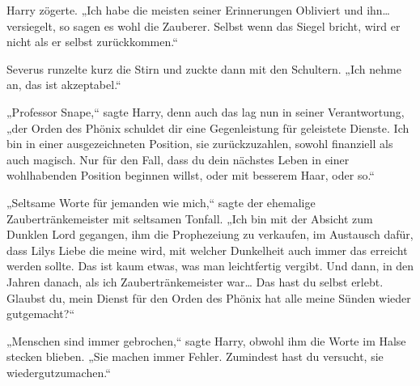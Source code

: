 Harry zögerte.
„Ich habe die meisten seiner Erinnerungen Obliviert und ihn…versiegelt, so sagen es wohl die Zauberer. Selbst wenn das Siegel bricht, wird er nicht als er selbst zurückkommen.“

Severus runzelte kurz die Stirn und zuckte dann mit den Schultern.
„Ich nehme an, das ist akzeptabel.“

„Professor Snape,“ sagte Harry, denn auch das lag nun in seiner Verantwortung, „der Orden des Phönix schuldet dir eine Gegenleistung für geleistete Dienste.
Ich bin in einer ausgezeichneten Position, sie zurückzuzahlen, sowohl finanziell als auch magisch. Nur für den Fall, dass du dein nächstes Leben in einer wohlhabenden Position beginnen willst, oder mit besserem Haar, oder so.“

„Seltsame Worte für jemanden wie mich,“ sagte der ehemalige Zaubertränkemeister mit seltsamen Tonfall. „Ich bin mit der Absicht zum Dunklen Lord gegangen, ihm die Prophezeiung zu verkaufen, im Austausch dafür, dass Lilys Liebe die meine wird, mit welcher Dunkelheit auch immer das erreicht werden sollte. Das ist kaum etwas, was man leichtfertig vergibt. Und dann, in den Jahren danach, als ich Zaubertränkemeister war… Das hast du selbst erlebt. Glaubst du, mein Dienst für den Orden des Phönix hat alle meine Sünden wieder gutgemacht?“

„Menschen sind immer gebrochen,“ sagte Harry, obwohl ihm die Worte im Halse stecken blieben. „Sie machen immer Fehler. Zumindest hast du versucht, sie wiedergutzumachen.“

